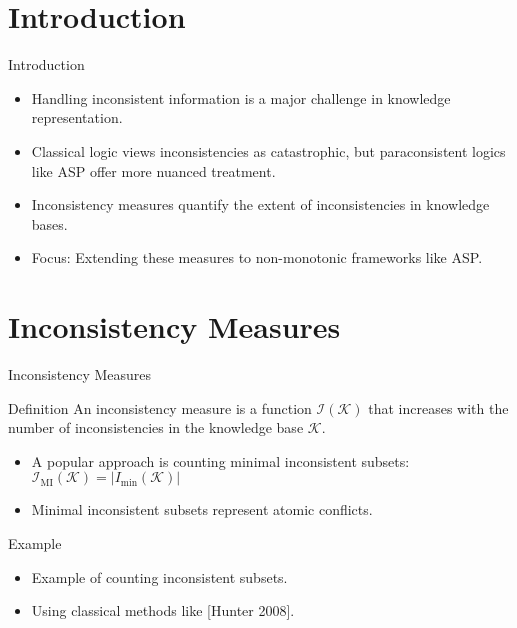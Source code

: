 \section{Introduction}

\begin{frame}{Introduction}
    \begin{itemize}
        \item Handling inconsistent information is a major challenge in knowledge representation.
        \item Classical logic views inconsistencies as catastrophic, but paraconsistent logics like ASP offer more nuanced treatment.
        \item Inconsistency measures quantify the extent of inconsistencies in knowledge bases.
        \item Focus: Extending these measures to non-monotonic frameworks like ASP.
    \end{itemize}
\end{frame}

\section{Inconsistency Measures}

\begin{frame}{Inconsistency Measures}
    \begin{block}{Definition}
        An inconsistency measure is a function \(\mathcal{I}(\mathcal{K})\) that increases with the number of inconsistencies in the knowledge base \(\mathcal{K}\).
    \end{block}

    \begin{itemize}
        \item A popular approach is counting minimal inconsistent subsets: \(\mathcal{I}_{\text{MI}}(\mathcal{K}) = |I_{\min}(\mathcal{K})|\)
        \item Minimal inconsistent subsets represent atomic conflicts.
    \end{itemize}
    \begin{block}{Example}
        \begin{itemize}
            \item Example of counting inconsistent subsets.
            \item Using classical methods like [Hunter 2008].
        \end{itemize}
    \end{block}
\end{frame}

